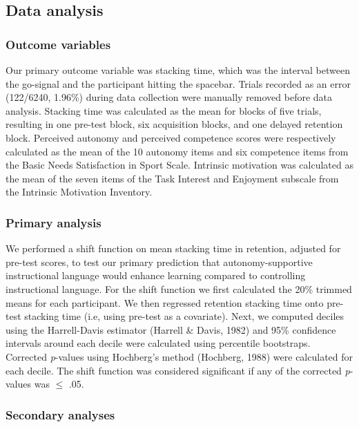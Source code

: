 \documentclass[
  doc, donotrepeattitle,floatsintext]{apa7}
\begin{document}
\hypertarget{data-analysis}{%
\subsection{Data analysis}\label{data-analysis}}

\hypertarget{outcome-variables}{%
\subsubsection{Outcome variables}\label{outcome-variables}}

Our primary outcome variable was stacking time, which was the interval between the go-signal and the participant hitting the spacebar. Trials recorded as an error (122/6240, 1.96\%) during data collection were manually removed before data analysis. Stacking time was calculated as the mean for blocks of five trials, resulting in one pre-test block, six acquisition blocks, and one delayed retention block. Perceived autonomy and perceived competence scores were respectively calculated as the mean of the 10 autonomy items and six competence items from the Basic Needs Satisfaction in Sport Scale. Intrinsic motivation was calculated as the mean of the seven items of the Task Interest and Enjoyment subscale from the Intrinsic Motivation Inventory.

\hypertarget{primary-analysis}{%
\subsubsection{Primary analysis}\label{primary-analysis}}

We performed a shift function on mean stacking time in retention, adjusted for pre-test scores, to test our primary prediction that autonomy-supportive instructional language would enhance learning compared to controlling instructional language. For the shift function we first calculated the 20\% trimmed means for each participant. We then regressed retention stacking time onto pre-test stacking time (i.e, using pre-test as a covariate). Next, we computed deciles using the Harrell-Davis estimator (Harrell \& Davis, 1982) and 95\% confidence intervals around each decile were calculated using percentile bootstraps. Corrected \emph{p}-values using Hochberg's method (Hochberg, 1988) were calculated for each decile. The shift function was considered significant if any of the corrected \emph{p}-values was \(\leq\) .05.

\hypertarget{secondary-analyses}{%
\subsubsection{Secondary analyses}\label{secondary-analyses}}
\end{document}

